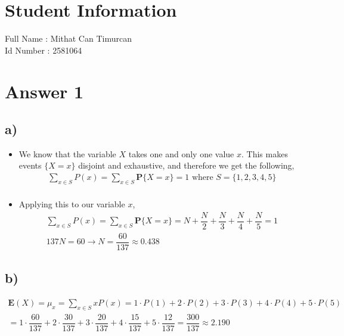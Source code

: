 \documentclass[12pt]{article}
\begin{document}
\section*{Student Information } 
Full Name :  Mithat Can Timurcan\\
Id Number :  2581064\\

\section*{Answer 1}

\subsection*{a)} 
\begin{itemize}
 \item We know that the variable $X$ takes one and only one value $x$. This makes events
$\{X = x\}$ disjoint and exhaustive, and therefore we get the following,
\begin{equation*}
    \begin{split}
        \sum_{x \in S} P(x) = \sum_{x \in S} \textbf{P}\{X = x\} = 1 \text{ where $S = \{1,2,3,4,5\}$}\\
    \end{split}
 \end{equation*}
 \item Applying this to our variable $x$,
 \begin{equation*}
    \begin{split}
        \sum_{x \in S} P(x) = \sum_{x \in S} \textbf{P}\{X = x\} = N + \dfrac{N}{2} + \dfrac{N}{3} + \dfrac{N}{4} + \dfrac{N}{5} = 1 \\
        137N = 60 \rightarrow N = \dfrac{60}{137} \approx 0.438
    \end{split}
 \end{equation*}
\end{itemize}


\subsection*{b)} 
\begin{equation*}
    \begin{split}
        \textbf{E}(X) = \mu_x = \sum_{x \in S} x P(x) = 1 \cdot P(1) + 2 \cdot P(2) + 3 \cdot P(3) + 4 \cdot P(4) + 5 \cdot P(5) \\
         = 1 \cdot \dfrac{60}{137} + 2 \cdot \dfrac{30}{137} + 3 \cdot \dfrac{20}{137} + 4 \cdot \dfrac{15}{137} + 5 \cdot \dfrac{12}{137} = \dfrac{300}{137} \approx 2.190
    \end{split}
 \end{equation*}
\end{document}
